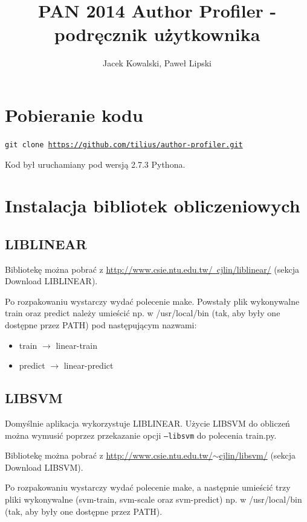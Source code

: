 \documentclass{article}
\title {PAN 2014 Author Profiler - podręcznik użytkownika}
\author{Jacek Kowalski, Paweł Lipski}
\begin{document}
\maketitle

\section{Pobieranie kodu}

\texttt{git clone \href{https://github.com/tilius/author-profiler.git}{https://github.com/tilius/author-profiler.git}}

Kod był uruchamiany pod wersją 2.7.3 Pythona.

\section{Instalacja bibliotek obliczeniowych}

\subsection{LIBLINEAR}

Bibliotekę można pobrać z \href{http://www.csie.ntu.edu.tw/~cjlin/liblinear/}{http://www.csie.ntu.edu.tw/~cjlin/liblinear/} (sekcja Download LIBLINEAR).

Po rozpakowaniu wystarczy wydać polecenie make. Powstały plik wykonywalne train oraz predict należy umieścić np. w /usr/local/bin (tak, aby były one dostępne przez PATH) pod następującym nazwami:
\begin{itemize}
\item train $\rightarrow$ linear-train
\item predict $\rightarrow$ linear-predict
\end{itemize}

\subsection{LIBSVM}

Domyślnie aplikacja wykorzystuje LIBLINEAR. Użycie LIBSVM do obliczeń można wymusić poprzez przekazanie opcji \texttt{--libsvm} do polecenia train.py.

Bibliotekę można pobrać z \href{http://www.csie.ntu.edu.tw/~cjlin/libsvm/}{http://www.csie.ntu.edu.tw/$\sim$cjlin/libsvm/} (sekcja Download LIBSVM).

Po rozpakowaniu wystarczy wydać polecenie make, a następnie umieścić trzy pliki wykonywalne (svm-train, svm-scale oraz svm-predict) np. w /usr/local/bin (tak, aby były one dostępne przez PATH).
\end{document}
